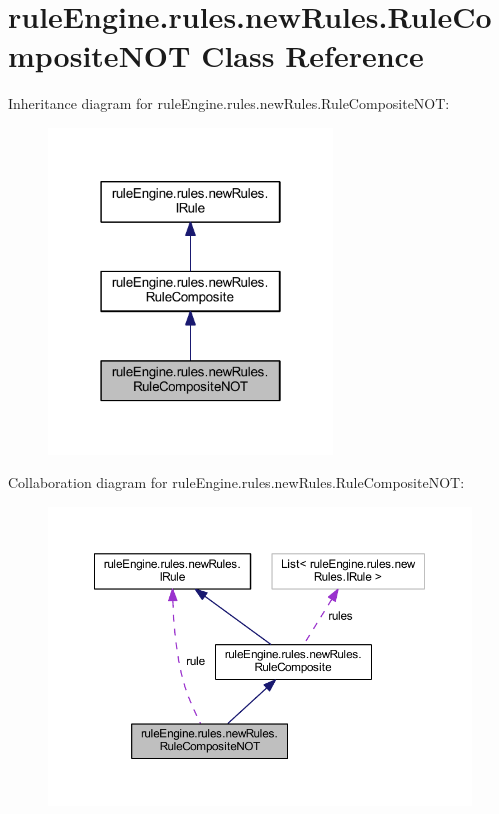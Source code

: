 \hypertarget{classrule_engine_1_1rules_1_1new_rules_1_1_rule_composite_n_o_t}{}\section{rule\+Engine.\+rules.\+new\+Rules.\+Rule\+Composite\+N\+OT Class Reference}
\label{classrule_engine_1_1rules_1_1new_rules_1_1_rule_composite_n_o_t}


Inheritance diagram for rule\+Engine.\+rules.\+new\+Rules.\+Rule\+Composite\+N\+OT\+:
\nopagebreak
\begin{figure}[H]
\begin{center}
\leavevmode
\includegraphics[width=214pt]{classrule_engine_1_1rules_1_1new_rules_1_1_rule_composite_n_o_t__inherit__graph}
\end{center}
\end{figure}


Collaboration diagram for rule\+Engine.\+rules.\+new\+Rules.\+Rule\+Composite\+N\+OT\+:
\nopagebreak
\begin{figure}[H]
\begin{center}
\leavevmode
\includegraphics[width=350pt]{classrule_engine_1_1rules_1_1new_rules_1_1_rule_composite_n_o_t__coll__graph}
\end{center}
\end{figure}
